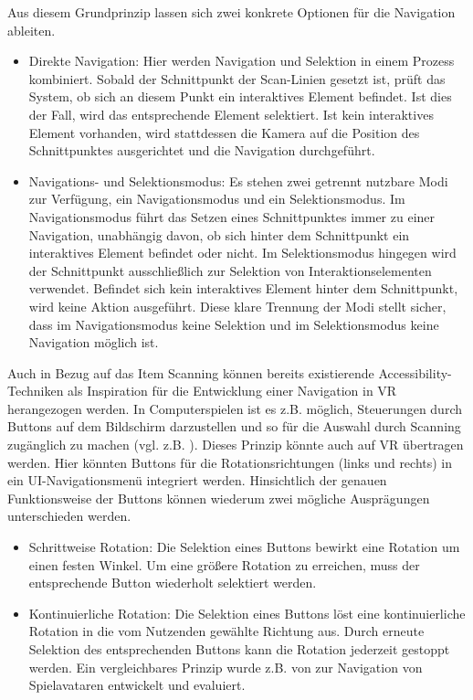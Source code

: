 Aus diesem Grundprinzip lassen sich zwei konkrete Optionen für die Navigation ableiten.

\begin{itemize}
    \item Direkte Navigation: Hier werden Navigation und Selektion in einem Prozess kombiniert. Sobald der Schnittpunkt der Scan-Linien gesetzt ist, prüft das System, ob sich an diesem Punkt ein interaktives Element befindet. Ist dies der Fall, wird das entsprechende Element selektiert. Ist kein interaktives Element vorhanden, wird stattdessen die Kamera auf die Position des Schnittpunktes ausgerichtet und die Navigation durchgeführt.
    \item Navigations- und Selektionsmodus: Es stehen zwei getrennt nutzbare Modi zur Verfügung, ein Navigationsmodus und ein Selektionsmodus. Im Navigationsmodus führt das Setzen eines Schnittpunktes immer zu einer Navigation, unabhängig davon, ob sich hinter dem Schnittpunkt ein interaktives Element befindet oder nicht. Im Selektionsmodus hingegen wird der Schnittpunkt ausschließlich zur Selektion von Interaktionselementen verwendet. Befindet sich kein interaktives Element hinter dem Schnittpunkt, wird keine Aktion ausgeführt. Diese klare Trennung der Modi stellt sicher, dass im Navigationsmodus keine Selektion und im Selektionsmodus keine Navigation möglich ist.
\end{itemize}

Auch in Bezug auf das Item Scanning können bereits existierende Accessibility-Techniken als Inspiration für die Entwicklung einer Navigation in VR herangezogen werden. In Computerspielen ist es z.B. möglich, Steuerungen durch Buttons auf dem Bildschirm darzustellen und so für die Auswahl durch Scanning zugänglich zu machen (vgl. z.B. \citep{10.1145/2159365.2159386, trewin_exploring_2009}).  
Dieses Prinzip könnte auch auf VR übertragen werden. Hier könnten Buttons für die Rotationsrichtungen (links und rechts) in ein UI-Navigationsmenü integriert werden.  Hinsichtlich der genauen Funktionsweise der Buttons können wiederum zwei mögliche Ausprägungen unterschieden werden. 

\begin{itemize}
    \item Schrittweise Rotation: Die Selektion eines Buttons bewirkt eine Rotation um einen festen Winkel. Um eine größere Rotation zu erreichen, muss der entsprechende Button wiederholt selektiert werden.
    \item Kontinuierliche Rotation: Die Selektion eines Buttons löst eine kontinuierliche Rotation in die vom Nutzenden gewählte Richtung aus. Durch erneute Selektion des entsprechenden Buttons kann die Rotation jederzeit gestoppt werden. Ein vergleichbares Prinzip wurde z.B. von \citet{10.1145/2159365.2159386} zur Navigation von Spielavataren entwickelt und evaluiert. 
\end{itemize}

